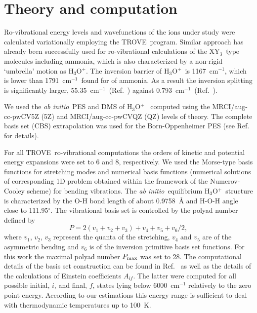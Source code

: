 \documentclass[prb,preprint,12pt,superscriptaddress,floatfix,bibnotes,nofootinbib,unsortedaddress,preprintnumbers,amsmath,amssymb]{revtex4}
\newcommand{\cm}{cm$^{-1}$}
\newcommand{\ai}{\textit{ab initio}}
\newcommand{\TROVE}{{\sc TROVE}}
\newcommand{\ohhh}{H$_3$O$^{+}$}
\newcommand{\2}{$_{2}$}
\newcommand{\3}{$_{3}$}
\def\deg{$^{\circ}$}
\begin{document}
\section{Theory and computation}

Ro-vibrational energy levels and wavefunctions of the ions under study were
calculated variationally employing the \TROVE\ program.
\cite{TROVE,15YaYuxx.method} Similar approach has already been successfully used
for ro-vibrational calculations of the XY\3\ type molecules
\cite{08YuThCa.NH3+,10YuCaYa.SbH3,13SoYuTe.PH3,13UnTeYu.SO3,14UnYuTe.SO3,
15SoAlTe.PH3,15AdYaYuJe.CH3} including ammonia, \cite{09YuBaYa.NH3,11YuBaTe.NH3}
 which is also characterized by a non-rigid `umbrella' motion as \ohhh.
 The
inversion barrier of \ohhh\ is 1167~\cm, which is lower than 1791~\cm\ found
for of ammonia.\cite{03RaMiHa.NH3} As a result the inversion splitting is
significantly larger, 55.35~\cm\ (Ref.~) against
0.793~\cm\ (Ref.~).

We used the \ai\ PES and DMS of \ohhh\ \cite{15OwYuPo.H3O+,15Yuxxxx.15NH3}
computed using the MRCI/aug-cc-pwCV5Z (5Z) and MRCI/aug-cc-pwCVQZ (QZ) levels of
theory. The complete basis set (CBS) extrapolation was used for the
Born-Oppenheimer PES (see Ref.~ for details).


For all \TROVE\ ro-vibrational computations the orders of kinetic and
potential energy expansions were set to 6 and 8, respectively. We used the
Morse-type basis functions for stretching modes and numerical basis functions
(numerical solutions of corresponding 1D problem obtained within the framework
of the Numerov-Cooley scheme) for bending vibrations. The \ai\ equilibrium
\ohhh\ structure is characterized by the O-H bond length of about 0.9758~{\AA}
and H-O-H angle close to 111.95\deg. The vibrational basis set is controlled by
the polyad number defined by
\begin{equation}
\label{e:polyad}
P = 2(v_1 + v_2 + v_3) + v_4 + v_5 + v_6/2,
\end{equation}
where $v_1$, $v_2$, $v_3$ represent the quanta of the stretching, $v_4$ and
$v_5$ are of the asymmetric bending and $v_6$ is of the inversion primitive
basis set functions. For this work the maximal polyad  number $P_{\rm max}$ was
set to 28. The computational details of the basis set construction can be found
in Ref.~ as well as the details of the calculations of
Einstein coefficients $A_{if}$. The latter were computed for all possible
initial, $i$, and final, $f$, states lying below 6000~cm$^{-1}$ relatively to
the zero point energy. According to our estimations this energy range is
sufficient to deal with thermodynamic temperatures up to 100~K.
\end{document}
